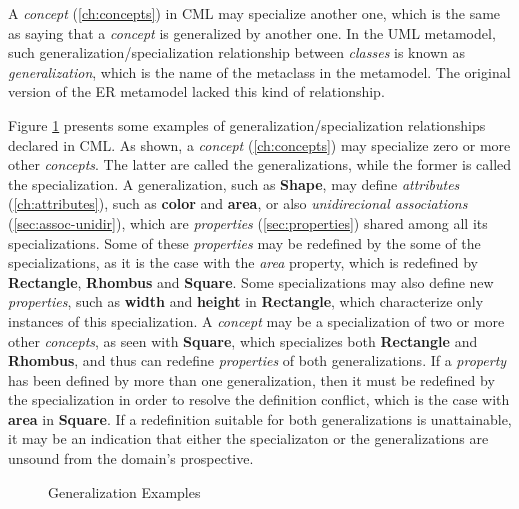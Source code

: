 \begin{definition}
A \emph{concept} (\ref{ch:concepts}) in CML may specialize another one,
which is the same as saying that a \emph{concept} is generalized by another one.
In the UML \cite{uml} metamodel,
such generalization/specialization relationship between \emph{classes}
is known as \emph{generalization}, which is the name of the metaclass in the metamodel.
The original version of the ER \cite{er} metamodel lacked this kind of relationship.
\end{definition}

\begin{examples}
Figure \ref{fig:ex:generalization} presents some examples of
generalization/specialization relationships declared in CML.
As shown,
a \emph{concept} (\ref{ch:concepts}) may specialize zero or more other \emph{concepts}.
The latter are called the generalizations,
while the former is called the specialization.
A generalization, such as \textbf{Shape},
may define \emph{attributes} (\ref{ch:attributes}),
such as \textbf{color} and \textbf{area},
or also \emph{unidirecional associations} (\ref{sec:assoc-unidir}),
which are \emph{properties} (\ref{sec:properties}) shared among all its specializations.
Some of these \emph{properties} may be redefined by the some of the specializations,
as it is the case with the \emph{area} property,
which is redefined by \textbf{Rectangle}, \textbf{Rhombus} and \textbf{Square}.
Some specializations may also define new \emph{properties},
such as \textbf{width} and \textbf{height} in \textbf{Rectangle},
which characterize only instances of this specialization.
A \emph{concept} may be a specialization of two or more other \emph{concepts},
as seen with \textbf{Square},
which specializes both \textbf{Rectangle} and \textbf{Rhombus},
and thus can redefine \emph{properties} of both generalizations.
If a \emph{property} has been defined by more than one generalization,
then it must be redefined by the specialization
in order to resolve the definition conflict,
which is the case with \textbf{area} in \textbf{Square}. 
If a redefinition suitable for both generalizations is unattainable,
it may be an indication that either the specializaton or the generalizations
are unsound from the domain's prospective.
\end{examples}

\begin{figure}
\verbatimfont{\small}

\caption{Generalization Examples}
\label{fig:ex:generalization}
\end{figure}
